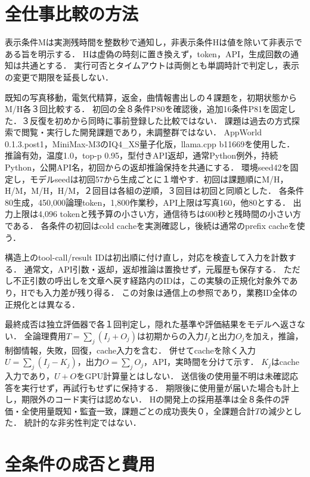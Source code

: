 \documentclass[letter]{ieicej}
\begin{document}
\section{全仕事比較の方法}
表示条件Mは実測残時間を整数秒で通知し，非表示条件Hは値を除いて非表示である旨を明示する．
Hは虚偽の時刻に置き換えず，token，API，生成回数の通知は共通とする．
実行可否とタイムアウトは両側とも単調時計で判定し，表示の変更で期限を延長しない．

既知の写真移動，電気代精算，返金，曲情報書出しの４課題を，初期状態からM/H各３回比較する．
初回の全８条件P80を確認後，追加16条件P81を固定した．３反復を初めから同時に事前登録した比較ではない．
課題は過去の方式探索で閲覧・実行した開発課題であり，未調整群ではない．
AppWorld 0.1.3.post1，MiniMax-M3のIQ4\_XS量子化版，llama.cpp b11669を使用した．
推論有効，温度1.0，top-p 0.95，型付きAPI返却，通常Python例外，持続Python，公開API名，初回からの返却推論保持を共通にする．
環境seed42を固定し，モデルseedは初回57から生成ごとに１増やす．初回は課題順にM/H，H/M，M/H，H/M，２回目は各組の逆順，３回目は初回と同順とした．
各条件80生成，450,000論理token，1,800作業秒，API上限は写真160，他80とする．
出力上限は4,096 tokenと残予算の小さい方，通信待ちは600秒と残時間の小さい方である．
各条件の初回はcold cacheを実測確認し，後続は通常のprefix cacheを使う．

構造上のtool-call/result IDは初出順に付け直し，対応を検査して入力を計数する．
通常文，API引数・返却，返却推論は置換せず，元履歴も保存する．
ただし不正引数の呼出しを文章へ戻す経路内のIDは，この実験の正規化対象外であり，Hでも入力差が残り得る．
この対象は通信上の参照であり，業務ID全体の正規化\cite{canonical}とは異なる．

最終成否は独立評価器で各１回判定し，隠れた基準や評価結果をモデルへ返さない．
全論理費用$T=\sum_j(I_j+O_j)$は初期からの入力$I_j$と出力$O_j$を加え，推論，制御情報，失敗，回復，cache入力を含む．
併せてcacheを除く入力$U=\sum_j(I_j-K_j)$，出力$O=\sum_jO_j$，API，実時間を分けて示す．
$K_j$はcache入力であり，$U+O$をGPU計算量とはしない．
送信後の使用量不明は未確認応答を実行せず，再試行もせずに保持する．
期限後に使用量が届いた場合も計上し，期限外のコード実行は認めない．
Hの開発上の採用基準は全８条件の評価・全使用量既知・監査一致，課題ごとの成功喪失０，全課題合計$T$の減少とした．
統計的な非劣性判定ではない．

\section{全条件の成否と費用}



\end{document}
